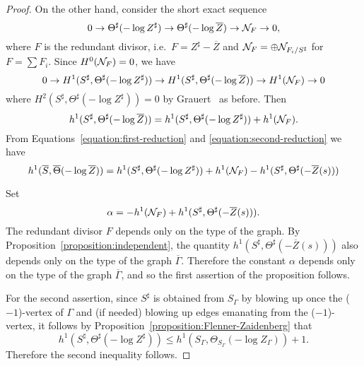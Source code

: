 \documentclass[a4paper, reqno, twoside]{amsart}
\theoremstyle{definition}
\numberwithin{equation}{section}
\begin{document}
\begin{proof}
On the other hand, consider the short exact sequence
    \begin{equation*}
    0 \to \Theta^{\sharp}(-\log{Z^{\sharp}}) \to    \Theta^{\sharp}(-\log{\overline{Z}}) \to {\ensuremath \mathcal{N}}_F \to 0,
    \end{equation*}
where $F$ is the redundant divisor, i.e.\  $F = Z^{\sharp} -\overline{Z}$ and ${\ensuremath \mathcal{N}}_F = \oplus {\ensuremath \mathcal{N}}_{F_i/S^{\sharp}}$ for $F = \sum F_i$. Since $H^0({\ensuremath \mathcal{N}}_F)=0$, we have
    \begin{equation}\label{equation:Z-sharp-Z-bar}
    0 \to H^1(S^{\sharp}, \Theta^{\sharp}(-\log{Z^{\sharp}})) \to
    H^1(S^{\sharp}, \Theta^{\sharp}(-\log{\overline{Z}})) \to
    H^1({\ensuremath \mathcal{N}}_F) \to 0    \end{equation}
where $H^2(S^{\sharp}, \Theta^{\sharp}(-\log{Z^{\sharp}}))=0$ by Grauert~\cite[Satz 1, p.~355]{Grauert-1962} as before. Then
\begin{equation}\label{equation:second-reduction}
h^1(S^{\sharp}, \Theta^{\sharp}(-\log{\overline{Z}}))
= h^1(S^{\sharp}, \Theta^{\sharp}(-\log{Z^{\sharp}}))
+ h^1({\ensuremath \mathcal{N}}_F).
\end{equation}
From Equations~\eqref{equation:first-reduction} and
\eqref{equation:second-reduction} we have
\begin{equation}\label{equation:third-reduction}
h^1(\overline{S}, \overline{\Theta}(-\log{\overline{Z}})) = h^1(S^{\sharp}, \Theta^{\sharp}(-\log{Z^{\sharp}})) + h^1({\ensuremath \mathcal{N}}_F) - h^1(S^{\sharp}, \Theta^{\sharp}(-\overline{Z}(s)))
\end{equation}

Set
\begin{equation*}
\alpha = - h^1({\ensuremath \mathcal{N}}_F) + h^1(S^{\sharp}, \Theta^{\sharp}(-\overline{Z}(s))).
\end{equation*}
The redundant divisor $F$ depends only on the type of the graph. By
Proposition~\ref{proposition:independent}, the quantity $h^1(S^{\sharp},
\Theta^{\sharp}(-\overline{Z}(s)))$ also depends only on the type of
the graph $\overline{\Gamma}$. Therefore the constant $\alpha$ depends
only on the type of the graph $\overline{\Gamma}$, and so the first
assertion of the proposition follows.

For the second assertion, since $S^{\sharp}$ is obtained from $S_{\Gamma}$ by blowing up once the ($-1$)-vertex of $\Gamma$ and (if needed) blowing up edges emanating from the ($-1$)-vertex, it follows by Proposition~\ref{proposition:Flenner-Zaidenberg} that
\begin{equation*}
h^1(S^{\sharp}, \Theta^{\sharp}(-\log{Z^{\sharp}})) \le h^1(S_{\Gamma}, \Theta_{S_{\Gamma}}(-\log{Z_{\Gamma}})) + 1.
\end{equation*}
Therefore the second inequality follows.
\end{proof}
\end{document}
